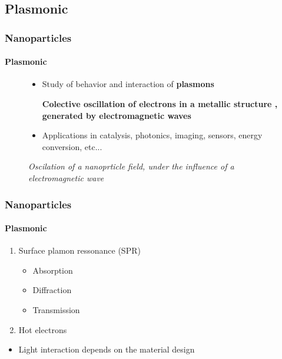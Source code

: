 \documentclass[aspectratio=169,fleqn,table]{beamer}
\begin{document}
\subsection{Plasmonic}
\begin{frame}
\frametitle{Nanoparticles}
\framesubtitle{Plasmonic}

\begin{figure}
\centering
\begin{minipage}[border=15pt]{0.45\textwidth}
	\centering
	\vspace{-165pt}
	\begin{itemize}
		\item
		Study of behavior and interaction of \textbf{plasmons}
		\begin{plsm}
			\textbf{Colective oscillation of electrons in a metallic structure , generated by electromagnetic waves}
		\end{plsm}
		\item
		Applications in catalysis, photonics, imaging, sensors, energy conversion, etc...
	\end{itemize}
\end{minipage}
\hfill
\begin{minipage}[b]{0.5\textwidth}
	\centering
	\vspace{-25pt}
    \caption {%
    \textit{Oscilation of a nanoprticle field, under the influence of a electromagnetic wave}}
\end{minipage}
\end{figure}

\end{frame}


\begin{frame}
\frametitle{Nanoparticles}
\framesubtitle{Plasmonic}

\begin{enumerate}
	\item
	Surface plamon ressonance (SPR)
	\begin{itemize}
		\item
		Absorption
		\item
		Diffraction
		\item
		Transmission
	\end{itemize}
	\item
	Hot electrons
\end{enumerate}
\begin{itemize}
    \item
    Light interaction depends on the material design
\end{itemize}

\end{frame}
\end{document}
